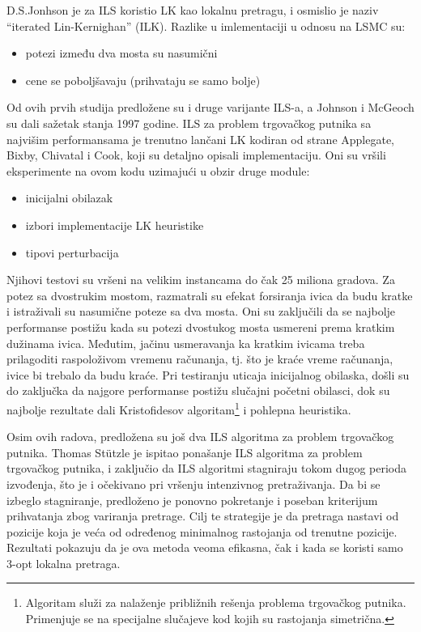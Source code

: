 \documentclass[a4paper]{article}
\newcommand{\q}[1]{``#1''}  %
\begin{document}
D.S.Jonhson je za ILS koristio LK kao lokalnu pretragu, i osmislio je naziv \q{iterated Lin-Kernighan} (ILK). Razlike u imlementaciji u odnosu na LSMC su:
\begin{itemize}
  \item potezi između dva mosta su nasumični
  \item cene se poboljšavaju (prihvataju se samo bolje)
\end{itemize}
Od ovih prvih studija predložene su i druge varijante ILS-a, a Johnson i McGeoch su dali sažetak stanja 1997 godine. 
ILS za problem trgovačkog putnika sa najvišim performansama je trenutno lančani LK kodiran od strane Applegate, Bixby, Chivatal i Cook, koji su detaljno opisali implementaciju. Oni su vršili eksperimente na ovom kodu uzimajući u obzir druge module:
\begin{itemize}
  \item inicijalni obilazak
  \item izbori implementacije LK heuristike
  \item tipovi perturbacija
\end{itemize}
Njihovi testovi su vršeni na velikim instancama do čak 25 miliona gradova. Za potez sa dvostrukim mostom, razmatrali su efekat forsiranja ivica da budu kratke i istraživali su nasumične poteze sa dva mosta. Oni su zaključili da se najbolje performanse postižu kada su potezi dvostukog mosta usmereni prema kratkim dužinama ivica. Međutim, jačinu usmeravanja ka kratkim ivicama treba prilagoditi raspoloživom vremenu računanja, tj. što je kraće vreme računanja, ivice bi trebalo da budu kraće. Pri testiranju uticaja inicijalnog obilaska, došli su do zaključka da najgore performanse postižu slučajni početni obilasci, dok su najbolje rezultate dali Kristofidesov algoritam\footnote{Algoritam služi za nalaženje približnih rešenja problema trgovačkog putnika. Primenjuje se na specijalne slučajeve kod kojih su rastojanja simetrična.} i pohlepna heuristika. 

Osim ovih radova, predložena su još dva ILS algoritma za problem trgovačkog putnika. Thomas Stützle je ispitao ponašanje ILS algoritma za problem trgovačkog putnika, i zaključio da ILS algoritmi stagniraju tokom dugog perioda izvođenja, što je i očekivano pri vršenju intenzivnog pretraživanja. Da bi se izbeglo stagniranje, predloženo je ponovno pokretanje i poseban kriterijum prihvatanja zbog variranja pretrage. Cilj te strategije je da pretraga nastavi od pozicije koja je veća od određenog minimalnog rastojanja od trenutne pozicije. Rezultati pokazuju da je ova metoda veoma efikasna, čak i kada se koristi samo 3-opt lokalna pretraga. 
\end{document}
